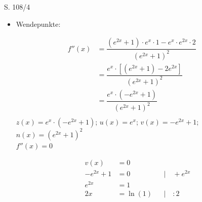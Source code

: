 \begin{Exercise}{S. 108/4}{}
\begin{enumerate}
\begin{enumerate}[label=\alph*),leftmargin=*]
{\begin{itemize}[leftmargin=*]
{\begin{align*}
                        &= \dfrac{1}{1 + e^{2x}} \cdot e^{x} &&\\[1.5ex]
                        &= \dfrac{e^{x}}{e^{2x} + 1} &&\\[-2.0ex]
                    \end{align*}
                    $z(x) = e^{x}$; \qquad $n(x) = e^{2x} + 1$\\[1.0ex]
                    $f'(x) = 0 \qquad \Rightarrow \qquad z(x) > 0 \qquad \Rightarrow$ \quad keine Nullstellen\\[1.0ex]
                    $n(x) > 0 \qquad \Rightarrow \qquad f'(x) > 0$\\[1.0ex]
                    $\Rightarrow \quad G_{f}$ ist sms in $\mathbb{R}$\\[1.0ex]
                    $\Rightarrow \quad G_{f}$ hat keine Extrempunkte\\[-2.0ex]
                    }
                \item Wendepunkte: \\[-2.0ex]{
                    \begin{align*}
                        f''(x) &= \dfrac{\left(e^{2x} + 1\right) \cdot e^{x} \cdot 1 - e^{x} \cdot e^{2x} \cdot 2}{\left(e^{2x} + 1\right)^{2}}&&\\[1.5ex]
                        &= \dfrac{e^{x} \cdot \left[\left(e^{2x} + 1\right) - 2e^{2x}\right]}{\left(e^{2x} + 1\right)^{2}}&&\\[1.5ex]
                        &= \dfrac{e^{x} \cdot \left(- e^{2x} + 1\right)}{\left(e^{2x} + 1\right)^{2}}&&\\[-1.5ex]
                    \end{align*}
                    $z(x) = e^{x} \cdot \left(- e^{2x} + 1\right)$; \qquad $u(x) =e^{x}$; \qquad $v(x) = -e^{2x} + 1$; \qquad $n(x) = \left(e^{2x} + 1\right)^{2}$\\[1.0ex]
                    $f''(x) = 0$\\[1.0ex]
                    \begin{minipage}[t]{0.4\linewidth}
                        \vspace{-2.0ex}
                        \begin{align*}
                            v(x) &= 0 \\[2.0ex]
                            -e^{2x} + 1 &= 0 &&| \quad + e^{2x}\\[1.5ex]
                            e^{2x} &= 1 &&\\[1.5ex]
                            2x &= \ln\left(1\right) &&| \quad :2\\[1.5ex]

\end{align*}
\end{minipage}}
\end{itemize}}
\end{enumerate}
\end{enumerate}
\end{Exercise}
